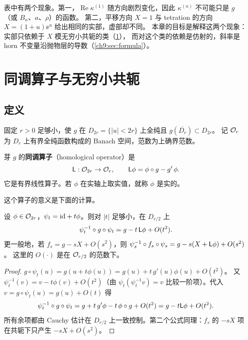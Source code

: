 表中有两个现象。第一，$\operatorname{Re}\kappa^{(1)}$ 随方向剧烈变化，因此 $\kappa^{(n)}$ 不可能只是 $g$（或 $B_n$、$a$、$\rho$）的函数。
第二，平移方向 $X=1$ 与 tetration 的方向 $X=(1+u)\ee^u$ 给出相同的实部，虚部却不同。
本章的目标是解释这两个现象：实部只依赖于 $X$ 模无穷小共轭的类（\cref{ch9:sec:homological}），
而对这个类的依赖是仿射的，斜率是 horn 不变量沿抛物层的导数（\cref{ch9:sec:formula}）。

\section{同调算子与无穷小共轭}\label{ch9:sec:homological}

\subsection{定义}
固定 $r>0$ 足够小，使 $g$ 在 $D_{2r}=\{|u|<2r\}$ 上全纯且 $g(\overline{D_r})\subset D_{2r}$。
记 $\mathcal O_r$ 为 $D_r$ 上有界全纯函数构成的 Banach 空间，范数为上确界范数。

\begin{definition}\label{ch9:def:Lop}
芽 $g$ 的\textbf{同调算子}（homological operator）是
\[
 \mathsf L:\mathcal O_{2r}\to\mathcal O_r,\qquad \mathsf L\phi=\phi\circ g-g'\,\phi .
\]
它是有界线性算子。若 $\phi$ 在实轴上取实值，就称 $\phi$ 是实的。
\end{definition}

这个算子的意义是下面的计算。

\begin{lemma}[无穷小共轭]\label{ch9:lem:infinitesimal-conjugacy}
设 $\phi\in\mathcal O_{2r}$，$\psi_t=\mathrm{id}+t\phi$。则对 $|t|$ 足够小，在 $D_{r/2}$ 上
\[
 \psi_t^{-1}\circ g\circ\psi_t=g-t\,\mathsf L\phi+O(t^2) .
\]
更一般地，若 $f_s=g-sX+O(s^2)$，则 $\psi_s^{-1}\circ f_s\circ\psi_s=g-s(X+\mathsf L\phi)+O(s^2)$。
这里的 $O(\cdot)$ 是在 $\mathcal O_{r/2}$ 的范数下。
\end{lemma}

\begin{proof}
$g\circ\psi_t(u)=g(u+t\phi(u))=g(u)+t\,g'(u)\phi(u)+O(t^2)$。
又 $\psi_t^{-1}(v)=v-t\phi(v)+O(t^2)$（由 $\psi_t(\psi_t^{-1}v)=v$ 比较一阶项）。代入 $v=g\circ\psi_t(u)=g(u)+O(t)$ 得
\[
 \psi_t^{-1}\circ g\circ\psi_t=g+t\,g'\phi-t\,\phi\circ g+O(t^2)=g-t\mathsf L\phi+O(t^2).
\]
所有余项都由 Cauchy 估计在 $D_{r/2}$ 上一致控制。第二个公式同理：$f_s$ 的 $-sX$ 项在共轭下只产生 $-sX+O(s^2)$。
\end{proof}

